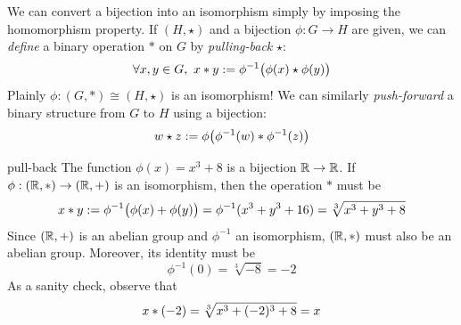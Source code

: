 

We can convert a bijection into an isomorphism simply by imposing the homomorphism property. If $(H,\star)$ and a bijection $\phi:G\to H$ are given, we can \emph{define} a binary operation $\ast$ on $G$ by \emph{pulling-back} $\star$:
\[
	\forall x,y\in G,\ x\mathbin{\ast} y:=\phi^{-1}\bigl(\phi(x)\mathbin{\star}\phi(y)\bigr)
\]
Plainly $\phi:(G,*)\cong(H,\star)$ is an isomorphism! We can similarly \emph{push-forward} a binary  structure from $G$ to $H$ using a bijection:
\[
	w\mathbin{\star} z:=\phi\bigl(\phi^{-1}(w)\mathbin{\ast}\phi^{-1}(z)\bigr)
\]

\begin{example}{}{pull-back}
  The function $\phi(x)=x^3+8$ is a bijection $\mathbb{R}\to\mathbb{R}$. If $\phi:(\mathbb{R},*)\to(\mathbb{R},+)$ is an isomorphism, then the operation $\ast$ must be
	\[
		x\mathbin{\ast} y:=\phi^{-1}\bigl(\phi(x)+\phi(y)\bigr) =\phi^{-1}(x^3+y^3+16) =\sqrt[3]{x^3+y^3+8}
	\]
	Since $(\mathbb{R},+)$ is an abelian group and $\phi^{-1}$ an isomorphism, $(\mathbb{R},*)$ must also be an abelian group. Moreover, its identity must be
	\[
		\phi^{-1}(0)=\sqrt[3]{-8}=-2
	\]
	As a sanity check, observe that
	\[
		x\mathbin{\ast} (-2)=\sqrt[3]{x^3+(-2)^3+8}=x
	\]
\end{example}


